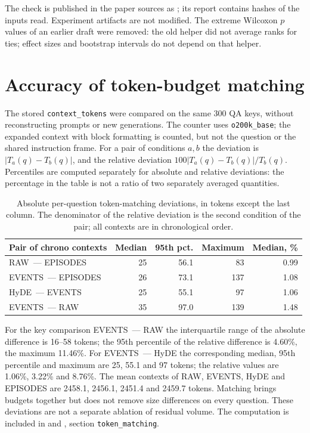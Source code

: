\documentclass[11pt,a4paper]{article}
\begin{document}
The check is published in the paper sources as ; its report
 contains hashes of the inputs read. Experiment
artifacts are not modified. The extreme Wilcoxon $p$ values of an earlier draft were
removed: the old helper did not average ranks for ties; effect sizes and bootstrap
intervals do not depend on that helper.

\section{Accuracy of token-budget matching}
\label{app:tokens}

The stored \texttt{context\_tokens} were compared on the same 300 QA keys, without
reconstructing prompts or new generations. The counter uses \texttt{o200k\_base}; the
expanded context with block formatting is counted, but not the question or the shared
instruction frame. For a pair of conditions $a,b$ the deviation is
$|T_a(q)-T_b(q)|$, and the relative deviation $100|T_a(q)-T_b(q)|/T_b(q)$. Percentiles
are computed separately for absolute and relative deviations: the percentage in the
table is not a ratio of two separately averaged quantities.

\begin{table}[ht]
\centering\small
\begin{tabular}{lrrrr}
\toprule
Pair of chrono contexts & Median & 95th pct. & Maximum & Median, \%\\
\midrule
RAW~--- EPISODES & 25 & 56.1 & 83 & 0.99\\
EVENTS~--- EPISODES & 26 & 73.1 & 137 & 1.08\\
HyDE~--- EVENTS & 25 & 55.1 & 97 & 1.06\\
EVENTS~--- RAW & 35 & 97.0 & 139 & 1.48\\
\bottomrule
\end{tabular}
\caption{Absolute per-question token-matching deviations, in tokens except the last
column. The denominator of the relative deviation is the second condition of the pair;
all contexts are in chronological order.}
\end{table}

For the key comparison EVENTS~--- RAW the interquartile range of the absolute difference
is 16--58 tokens; the 95th percentile of the relative difference is 4.60\%, the maximum
11.46\%. For EVENTS~--- HyDE the corresponding median, 95th percentile and maximum are 25,
55.1 and 97 tokens; the relative values are 1.06\%, 3.22\% and 8.76\%. The mean contexts
of RAW, EVENTS, HyDE and EPISODES are 2458.1, 2456.1, 2451.4 and 2459.7 tokens. Matching
brings budgets together but does not remove size differences on every question. These
deviations are not a separate ablation of residual volume. The computation is included
in  and , section
\texttt{token\_matching}.
\end{document}
